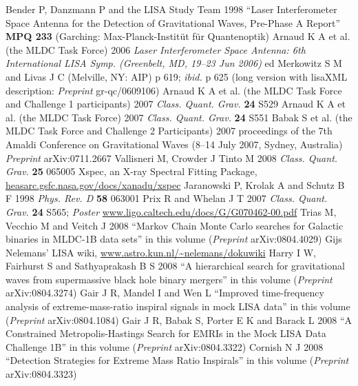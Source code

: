 \documentclass{iopart}
\begin{document}
\begin{thebibliography}{99}
%
 Bender P, Danzmann P and the LISA Study Team 1998 ``Laser Interferometer Space Antenna for the Detection of Gravitational Waves, Pre-Phase A Report'' \textbf{MPQ 233} (Garching: Max-Planck-Instit\"ut f\"ur Quantenoptik) 
%
 Arnaud K A et al. (the MLDC Task Force) 2006 \textit{Laser Interferometer Space Antenna: 6th International LISA Symp. (Greenbelt, MD, 19--23 Jun 2006)} ed Merkowitz S M and Livas J C (Melville, NY: AIP) p 619; \textit{ibid.} p 625 (long version with lisaXML description: \textit{Preprint} gr-qc/0609106)
%
 Arnaud K A et al. (the MLDC Task Force and Challenge 1 participants) 2007 \textit{Class. Quant. Grav.} \textbf{24} S529
%
 Arnaud K A et al. (the MLDC Task Force) 2007 \textit{Class. Quant. Grav.} \textbf{24} S551
%
 Babak S et al. (the MLDC Task Force and Challenge 2 Participants) 2007 proceedings of the 7th Amaldi Conference on Gravitational Waves (8--14 July 2007, Sydney, Australia) \textit{Preprint} arXiv:0711.2667
%
 Vallisneri M, Crowder J Tinto M 2008 \textit{Class. Quant. Grav.} \textbf{25} 065005
%
 Xspec, an X-ray Spectral Fitting Package, \url{heasarc.gsfc.nasa.gov/docs/xanadu/xspec}
%
 Jaranowski P, Krolak A and Schutz B F 1998 \textit{Phys. Rev. D} \textbf{58} 063001
%
 Prix R and Whelan J T 2007 \textit{Class. Quant. Grav.} \textbf{24} S565; \textit{Poster} \url{www.ligo.caltech.edu/docs/G/G070462-00.pdf}
%
 Trias M, Vecchio M and Veitch J 2008
``Markov Chain Monte Carlo searches for Galactic binaries in MLDC-1B data sets'' in this volume (\textit{Preprint} arXiv:0804.4029)
%
 Gijs Nelemans' LISA wiki, \url{www.astro.kun.nl/~nelemans/dokuwiki}
%
 Harry I W, Fairhurst S and Sathyaprakash B S 2008 ``A hierarchical search for gravitational waves from supermassive black hole binary mergers'' in this volume (\textit{Preprint} arXiv:0804.3274)
%
 Gair J R, Mandel I and Wen L
``Improved time-frequency analysis of extreme-mass-ratio inspiral signals in mock LISA data'' in this volume (\textit{Preprint} arXiv:0804.1084)
%
Gair J R, Babak S, Porter E K and Barack L 2008 ``A Constrained Metropolis-Hastings Search for EMRIs in the Mock LISA Data Challenge 1B'' in this volume (\textit{Preprint} arXiv:0804.3322)
%
 Cornish N J 2008 ``Detection Strategies for Extreme Mass Ratio Inspirals'' in this volume (\textit{Preprint} arXiv:0804.3323)

\end{thebibliography}
\end{document}
